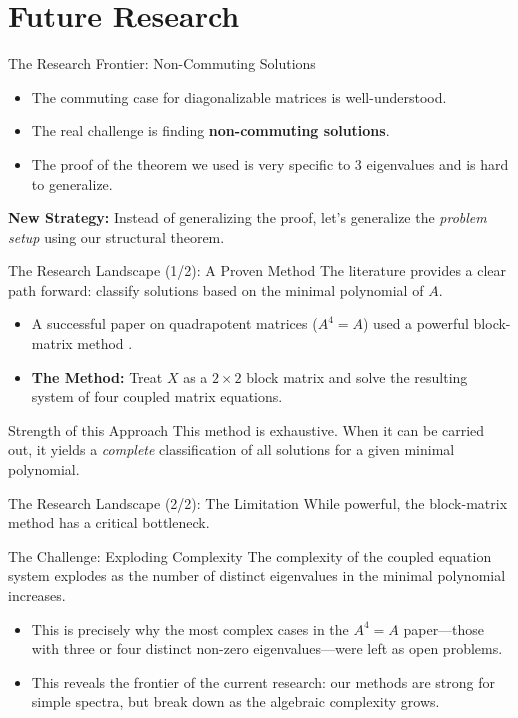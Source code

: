 \documentclass{beamer}
\begin{document}
\section{Future Research}

\begin{frame}{The Research Frontier: Non-Commuting Solutions}
  \begin{itemize}
    \item The commuting case for diagonalizable matrices is well-understood. \cite{diagonalizable}
    \item The real challenge is finding \textbf{non-commuting solutions}.
    \item The proof of the theorem we used is very specific to 3 eigenvalues and is hard to generalize.
  \end{itemize}
  \vfill
  \textbf{New Strategy:} Instead of generalizing the proof, let's generalize the \textit{problem setup} using our structural theorem.
\end{frame}

\begin{frame}{The Research Landscape (1/2): A Proven Method}
  The literature provides a clear path forward: classify solutions based on the minimal polynomial of $A$.
  \begin{itemize}
    \item A successful paper on quadrapotent matrices ($A^4=A$) used a powerful block-matrix method \cite{quadrapotent}.
    \item \textbf{The Method:} Treat $X$ as a $2 \times 2$ block matrix and solve the resulting system of four coupled matrix equations.
  \end{itemize}
  \begin{block}{Strength of this Approach}
    This method is exhaustive. When it can be carried out, it yields a \textit{complete} classification of all solutions for a given minimal polynomial.
  \end{block}
\end{frame}

\begin{frame}{The Research Landscape (2/2): The Limitation}
  While powerful, the block-matrix method has a critical bottleneck.
  \begin{alertblock}{The Challenge: Exploding Complexity}
  The complexity of the coupled equation system explodes as the number of distinct eigenvalues in the minimal polynomial increases.
  \end{alertblock}
  \begin{itemize}
    \item This is precisely why the most complex cases in the $A^4=A$ paper—those with three or four distinct non-zero eigenvalues—were left as open problems.
    \item This reveals the frontier of the current research: our methods are strong for simple spectra, but break down as the algebraic complexity grows.
  \end{itemize}
\end{frame}
\end{document}
